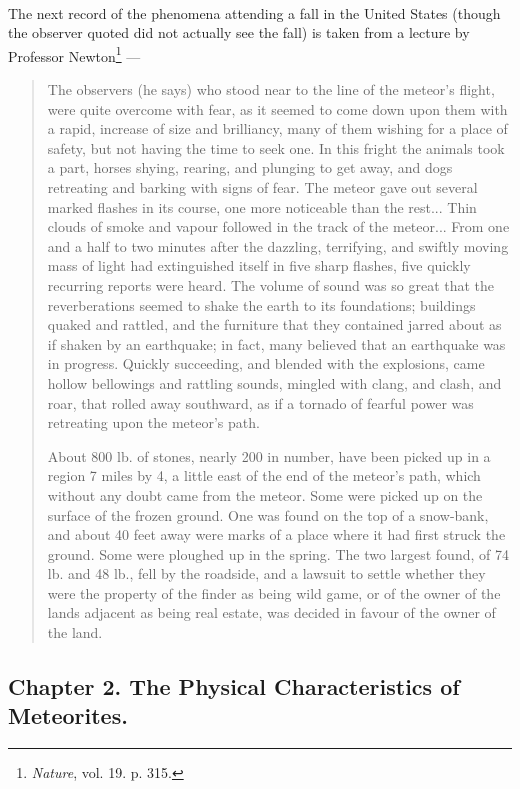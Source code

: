 \documentclass[a4paper, 12pt, oneside, polutonikogreek, english]{article}
\begin{document}
\paragraph{}
The next record of the phenomena attending a fall in the United States (though the observer quoted did not actually see the fall) is taken from a lecture by Professor Newton\footnote{\emph{Nature}, vol. 19. p. 315.} ---
\begin{quotation}
The observers (he says) who stood near to the line of the meteor's flight, were quite overcome with fear, as it seemed to come down upon them with a rapid, increase of size and brilliancy, many of them wishing for a place of safety, but not having the time to seek one. In this fright the animals took a part, horses shying, rearing, and plunging to get away, and dogs retreating and barking with signs of fear. The meteor gave out several marked flashes in its course, one more noticeable than the rest... Thin clouds of smoke and vapour followed in the track of the meteor... From one and a half to two minutes after the dazzling, terrifying, and swiftly moving mass of light had extinguished itself in five sharp flashes, five quickly recurring reports were heard. The volume of sound was so great that the reverberations seemed to shake the earth to its foundations; buildings quaked and rattled, and the furniture that they contained jarred about as if shaken by an earthquake; in fact, many believed that an earthquake was in progress. Quickly succeeding, and blended with the explosions, came hollow bellowings and rattling sounds, mingled with clang, and clash, and roar, that rolled away southward, as if a tornado of fearful power was retreating upon the meteor's path.

About 800 lb. of stones, nearly 200 in number, have been picked up in a region 7 miles by 4, a little east of the end of the meteor's path, which without any doubt came from the meteor. Some were picked up on the surface of the frozen ground. One was found on the top of a snow-bank, and about 40 feet away were marks of a place where it had first struck the ground. Some were ploughed up in the spring. The two largest found, of 74 lb. and 48 lb., fell by the roadside, and a lawsuit to settle whether they were the property of the finder as being wild game, or of the owner of the lands adjacent as being real estate, was decided in favour of the owner of the land.
\end{quotation}
\clearpage
\subsection{Chapter 2. The Physical Characteristics of Meteorites.}
\end{document}
